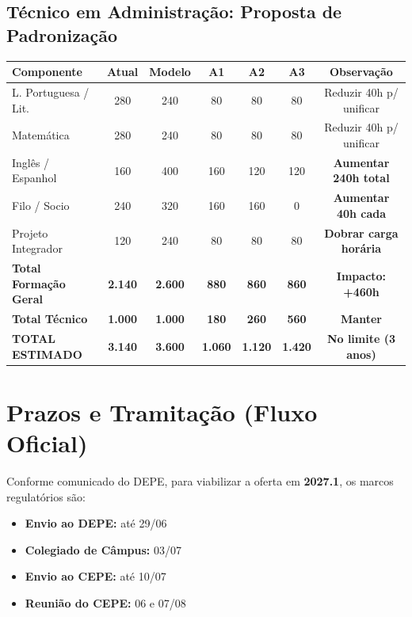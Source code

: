 \documentclass[a4paper,12pt]{article}
\begin{document}
\subsection{Técnico em Administração: Proposta de Padronização}
\begin{center}
\scriptsize
\begin{tabular}{lcccccc}
\toprule
\rowcolor{gray!20} \textbf{Componente} & \textbf{Atual} & \textbf{Modelo} & \textbf{A1} & \textbf{A2} & \textbf{A3} & \textbf{Observação} \\ \midrule
L. Portuguesa / Lit. & 280 & 240 & 80 & 80 & 80 & Reduzir 40h p/ unificar \\
Matemática & 280 & 240 & 80 & 80 & 80 & Reduzir 40h p/ unificar \\
Inglês / Espanhol & 160 & 400 & 160 & 120 & 120 & \textbf{Aumentar 240h total} \\
Filo / Socio & 240 & 320 & 160 & 160 & 0 & \textbf{Aumentar 40h cada} \\
Projeto Integrador & 120 & 240 & 80 & 80 & 80 & \textbf{Dobrar carga horária} \\ \midrule
\rowcolor{yellow!10} \textbf{Total Formação Geral} & \textbf{2.140} & \textbf{2.600} & \textbf{880} & \textbf{860} & \textbf{860} & \textbf{Impacto: +460h} \\
\rowcolor{yellow!10} \textbf{Total Técnico} & \textbf{1.000} & \textbf{1.000} & \textbf{180} & \textbf{260} & \textbf{560} & \textbf{Manter} \\ \midrule
\rowcolor{green!10} \textbf{TOTAL ESTIMADO} & \textbf{3.140} & \textbf{3.600} & \textbf{1.060} & \textbf{1.120} & \textbf{1.420} & \textbf{No limite (3 anos)} \\ \bottomrule
\end{tabular}
\end{center}

\section{Prazos e Tramitação (Fluxo Oficial)}
Conforme comunicado do DEPE, para viabilizar a oferta em \textbf{2027.1}, os marcos regulatórios são:

\begin{itemize}
    \item \textbf{Envio ao DEPE:} até 29/06
    \item \textbf{Colegiado de Câmpus:} 03/07
    \item \textbf{Envio ao CEPE:} até 10/07
    \item \textbf{Reunião do CEPE:} 06 e 07/08
\end{itemize}
\end{document}
